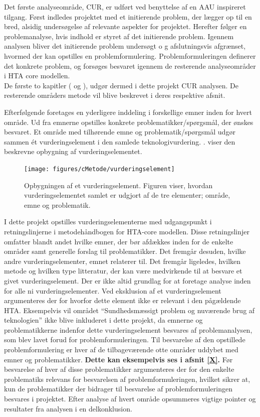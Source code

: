 Det første analyseområde, CUR, er udført ved benyttelse af en AAU inspireret tilgang. Først indledes projektet med et initierende problem, der lægger op til en bred, alsidig undersøgelse af relevante aspekter for projektet. Herefter følger en problemanalyse, hvis indhold er styret af det initierende problem. Igennem analysen bliver det initierende problem undersøgt o	g afslutningsvis afgrænset, hvormed der kan opstilles en problemformulering. Problemformuleringen definerer det konkrete problem, og forsøges besvaret igennem de resterende analyseområder i HTA core modellen. \\
De første to kapitler ( og ), udgør dermed i dette projekt CUR analysen. De resterende områders metode vil blive beskrevet i deres respektive afsnit.  	

Efterfølgende foretages en yderligere inddeling i forskellige emner inden for hvert område. Ud fra emnerne opstilles konkrete problematikker/spørgsmål, der ønskes besvaret. Et område med tilhørende emne og problematik/spørgsmål udgør sammen ét vurderingselement i den samlede teknologivurdering. \citep{HTAcore}.  viser den beskrevne opbygning af vurderingselementet. 

\begin{figure}[H] 
\begin{center}
\texttt{[image: figures/cMetode/vurderingselement]}
\end{center}
\caption{Opbygningen af et vurderingselement. Figuren viser, hvordan vurderingselementet samlet er udgjort af de tre elementer; område, emne og problematik.} 
\label{fig:vurderingselement} 
\end{figure}

I dette projekt opstilles vurderingselementerne med udgangspunkt i retningslinjerne i metodehåndbogen for HTA-core modellen. Disse retningslinjer omfatter blandt andet hvilke emner, der bør afdækkes inden for de enkelte områder samt generelle forslag til problematikker. Det fremgår desuden, hvilke andre vurderingselementer, emnet relaterer til. Det fremgår ligeledes, hvilken metode og hvilken type litteratur, der kan være medvirkende til at besvare et givet vurderingselement. \citep{HTAcore} 
Der er ikke altid grundlag for at foretage analyse inden for alle ni vurderingselementer. Ved eksklusion  af et vurderingselement argumenteres der for hvorfor dette element ikke er relevant i den pågældende HTA. \citep{HTAcore} Eksempelvis vil området “Sundhedsmæssigt problem og nuværende brug af teknologien” ikke blive inkluderet i dette projekt, da emnerne og problematikkerne indenfor dette vurderingselement besvares af problemanalysen, som blev lavet forud for problemformuleringen. 
Til besvarelse af den opstillede problemformulering er hver af de tilbageværende otte områder uddybet med emner og problematikker. \textbf{Dette kan eksempelvis ses i afsnit \ref{X}. }
Før besvarelse af hver af disse problematikker argumenteres der for den enkelte problematiks relevans for besvarelsen af problemformuleringen, hvilket sikrer at, kun de problematikker der bidrager til  besvarelse af problemformuleringen besvares i projektet. Efter analyse af hvert område opsummeres vigtige pointer og resultater fra analysen i en delkonklusion.

